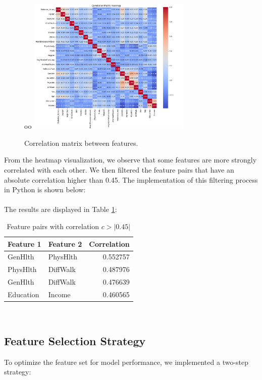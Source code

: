 

\begin{figure}[H]
    \centering
oo    \includegraphics[width=0.7\textwidth]{images/diabetes_correlation_matrix.png}
    \caption{Correlation matrix between features.}
    \label{fig:correlation-matrix}
\end{figure}

From the heatmap visualization, we observe that some features are more strongly correlated with each other. We then filtered the feature pairs that have an absolute correlation higher than 0.45. The implementation of this filtering process in Python is shown below:
\\

\\
The results are displayed in Table \ref{table:correlation-filtered}:

\begin{table}[ht]
\centering
\begin{tabular}{ |l|l|r| }
\hline
\textbf{Feature 1} & \textbf{Feature 2} & \textbf{Correlation} \\
\hline
GenHlth    & PhysHlth   & 0.552757 \\
PhysHlth   & DiffWalk   & 0.487976 \\
GenHlth    & DiffWalk   & 0.476639 \\
Education  & Income     & 0.460565 \\
\hline
\end{tabular}
\caption{Feature pairs with correlation $c > |0.45|$}
\label{table:correlation-filtered}
\end{table}
\\
\subsection*{Feature Selection Strategy}
To optimize the feature set for model performance, we implemented a two-step strategy:


